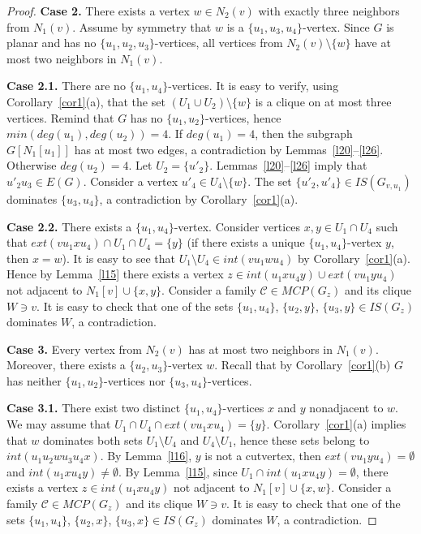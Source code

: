 \documentclass[12pt]{article}
\begin{document}
\begin{proof}
\textbf{Case 2.} There exists a vertex $w \in N_2(v)$ with exactly three neighbors from $N_1(v)$. Assume by symmetry that $w$ is a $\{u_1,u_3,u_4\}$-vertex. Since $G$ is planar and has no $\{u_1,u_2,u_3\}$-vertices, all vertices from $N_2(v) \setminus \{w\}$ have at most two neighbors in $N_1(v)$.

\textbf{Case 2.1.} There are no $\{u_1,u_4\}$-vertices. It is easy to verify, using Corollary~\ref{cor1}(a), that the set $(U_1 \cup U_2) \setminus \{w\}$ is a clique on at most three vertices. Remind that $G$ has no $\{u_1,u_2\}$-vertices, hence $min(deg(u_1),deg(u_2)) = 4$. If $deg(u_1) = 4$, then the subgraph $G[N_1[u_1]]$ has at most two edges, a contradiction by Lemmas~\ref{l20}--\ref{l26}. Otherwise $deg(u_2) = 4$. Let $U_2 = \{u'_2\}$. Lemmas~\ref{l20}--\ref{l26} imply that $u'_2u_3 \in E(G)$. Consider a vertex $u'_4 \in U_4 \setminus \{w\}$. The set $\{u'_2,u'_4\} \in IS(G_{v,u_1})$ dominates $\{u_3,u_4\}$, a contradiction by Corollary~\ref{cor1}(a).

\textbf{Case 2.2.} There exists a $\{u_1,u_4\}$-vertex. Consider vertices $x,y \in U_1 \cap U_4$ such that $ext(vu_1xu_4) \cap U_1 \cap U_4 = \{y\}$ (if there exists a unique $\{u_1,u_4\}$-vertex $y$, then $x = w$). It is easy to see that $U_1 \setminus U_4 \in int(vu_1wu_4)$ by Corollary~\ref{cor1}(a). Hence by Lemma~\ref{l15} there exists a vertex $z \in int(u_1xu_4y) \cup ext(vu_1yu_4)$ not adjacent to $N_1[v] \cup \{x,y\}$. Consider a family $\mathcal{C} \in MCP(G_z)$ and its clique $W \ni v$. It is easy to check that one of the sets $\{u_1,u_4\}$, $\{u_2,y\}$, $\{u_3,y\} \in IS(G_z)$ dominates $W$, a contradiction. 

\textbf{Case 3.} Every vertex from $N_2(v)$ has at most two neighbors in $N_1(v)$. Moreover, there exists a $\{u_2,u_3\}$-vertex $w$. Recall that by Corollary~\ref{cor1}(b) $G$ has neither $\{u_1,u_2\}$-vertices nor $\{u_3,u_4\}$-vertices.

\textbf{Case 3.1.} There exist two distinct $\{u_1,u_4\}$-vertices $x$ and $y$ nonadjacent to $w$. We may assume that $U_1 \cap U_4 \cap ext(vu_1xu_4) = \{y\}$. Corollary~\ref{cor1}(a) implies that $w$ dominates both sets $U_1 \setminus U_4$ and $U_4 \setminus U_1$, hence these sets belong to $int(u_1u_2wu_3u_4x)$. By Lemma~\ref{l16}, $y$ is not a cutvertex, then $ext(vu_1yu_4) = \emptyset$ and $int(u_1xu_4y) \neq \emptyset$. By Lemma~\ref{l15}, since $U_1 \cap int(u_1xu_4y) = \emptyset$, there exists a vertex $z \in int(u_1xu_4y)$ not adjacent to $N_1[v] \cup \{x,w\}$. Consider a family $\mathcal{C} \in MCP(G_z)$ and its clique $W \ni v$. It is easy to check that one of the sets $\{u_1,u_4\}$, $\{u_2,x\}$, $\{u_3,x\} \in IS(G_z)$ dominates $W$, a contradiction. 


\end{proof}
\end{document}
